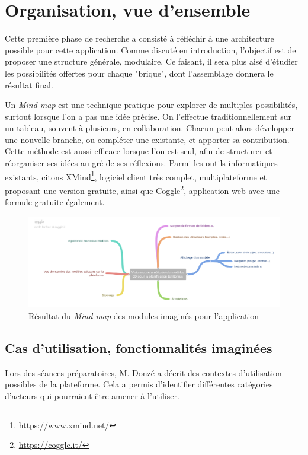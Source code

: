 \chapter{Organisation, vue d'ensemble}
\label{Chapter2}

Cette première phase de recherche a consisté à réfléchir à une architecture possible pour cette application. Comme discuté en introduction, l'objectif est de proposer une structure générale, modulaire. Ce faisant, il sera plus aisé d'étudier les possibilités offertes pour chaque "brique", dont l'assemblage donnera le résultat final.

Un \textit{Mind map} est une technique pratique pour explorer de multiples possibilités, surtout lorsque l'on a pas une idée précise. On l'effectue traditionnellement sur un tableau, souvent à plusieurs, en collaboration. Chacun peut alors développer une nouvelle branche, ou compléter une existante, et apporter sa contribution.
Cette méthode est aussi efficace lorsque l'on est seul, afin de structurer et réorganiser ses idées au gré de ses réflexions.
Parmi les outils informatiques existants, citons XMind\footnote{\url{https://www.xmind.net/}}, logiciel client très complet, multiplateforme et proposant une version gratuite, ainsi que Coggle\footnote{\url{https://coggle.it/}}, application web avec une formule gratuite également.

\begin{figure}
    \centering
    \includegraphics[width=\linewidth]{Figures/mip-viewer-mindmap.png}
    \caption{Résultat du \textit{Mind map} des modules imaginés pour l'application}
    \label{fig:mip-viewer-mindmap}
\end{figure}

\section{Cas d'utilisation, fonctionnalités imaginées}

Lors des séances préparatoires, M. Donzé a décrit des contextes d'utilisation possibles de la plateforme. Cela a permis d'identifier différentes catégories d'acteurs qui pourraient être amener à l'utiliser.

